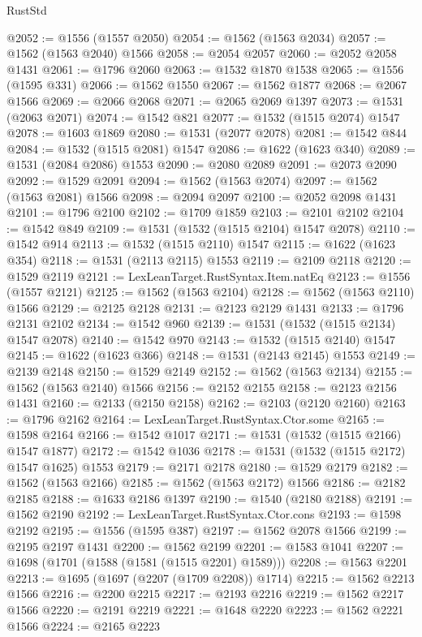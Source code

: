 \begin{lexlean}{RustStd}
\begin{coremodule}
@2052 := @1556 (@1557 @2050)
@2054 := @1562 (@1563 @2034)
@2057 := @1562 (@1563 @2040) @1566
@2058 := @2054 @2057
@2060 := @2052 @2058 @1431
@2061 := @1796 @2060
@2063 := @1532 @1870 @1538
@2065 := @1556 (@1595 @331)
@2066 := @1562 @1550
@2067 := @1562 @1877
@2068 := @2067 @1566
@2069 := @2066 @2068
@2071 := @2065 @2069 @1397
@2073 := @1531 (@2063 @2071)
@2074 := @1542 @821
@2077 := @1532 (@1515 @2074) @1547
@2078 := @1603 @1869
@2080 := @1531 (@2077 @2078)
@2081 := @1542 @844
@2084 := @1532 (@1515 @2081) @1547
@2086 := @1622 (@1623 @340)
@2089 := @1531 (@2084 @2086) @1553
@2090 := @2080 @2089
@2091 := @2073 @2090
@2092 := @1529 @2091
@2094 := @1562 (@1563 @2074)
@2097 := @1562 (@1563 @2081) @1566
@2098 := @2094 @2097
@2100 := @2052 @2098 @1431
@2101 := @1796 @2100
@2102 := @1709 @1859
@2103 := @2101 @2102
@2104 := @1542 @849
@2109 := @1531 (@1532 (@1515 @2104) @1547 @2078)
@2110 := @1542 @914
@2113 := @1532 (@1515 @2110) @1547
@2115 := @1622 (@1623 @354)
@2118 := @1531 (@2113 @2115) @1553
@2119 := @2109 @2118
@2120 := @1529 @2119
@2121 := LexLeanTarget.RustSyntax.Item.natEq
@2123 := @1556 (@1557 @2121)
@2125 := @1562 (@1563 @2104)
@2128 := @1562 (@1563 @2110) @1566
@2129 := @2125 @2128
@2131 := @2123 @2129 @1431
@2133 := @1796 @2131 @2102
@2134 := @1542 @960
@2139 := @1531 (@1532 (@1515 @2134) @1547 @2078)
@2140 := @1542 @970
@2143 := @1532 (@1515 @2140) @1547
@2145 := @1622 (@1623 @366)
@2148 := @1531 (@2143 @2145) @1553
@2149 := @2139 @2148
@2150 := @1529 @2149
@2152 := @1562 (@1563 @2134)
@2155 := @1562 (@1563 @2140) @1566
@2156 := @2152 @2155
@2158 := @2123 @2156 @1431
@2160 := @2133 (@2150 @2158)
@2162 := @2103 (@2120 @2160)
@2163 := @1796 @2162
@2164 := LexLeanTarget.RustSyntax.Ctor.some
@2165 := @1598 @2164
@2166 := @1542 @1017
@2171 := @1531 (@1532 (@1515 @2166) @1547 @1877)
@2172 := @1542 @1036
@2178 := @1531 (@1532 (@1515 @2172) @1547 @1625) @1553
@2179 := @2171 @2178
@2180 := @1529 @2179
@2182 := @1562 (@1563 @2166)
@2185 := @1562 (@1563 @2172) @1566
@2186 := @2182 @2185
@2188 := @1633 @2186 @1397
@2190 := @1540 (@2180 @2188)
@2191 := @1562 @2190
@2192 := LexLeanTarget.RustSyntax.Ctor.cons
@2193 := @1598 @2192
@2195 := @1556 (@1595 @387)
@2197 := @1562 @2078 @1566
@2199 := @2195 @2197 @1431
@2200 := @1562 @2199
@2201 := @1583 @1041
@2207 := @1698 (@1701 (@1588 (@1581 (@1515 @2201) @1589)))
@2208 := @1563 @2201
@2213 := @1695 (@1697 (@2207 (@1709 @2208)) @1714)
@2215 := @1562 @2213 @1566
@2216 := @2200 @2215
@2217 := @2193 @2216
@2219 := @1562 @2217 @1566
@2220 := @2191 @2219
@2221 := @1648 @2220
@2223 := @1562 @2221 @1566
@2224 := @2165 @2223

\end{coremodule}
\end{lexlean}

